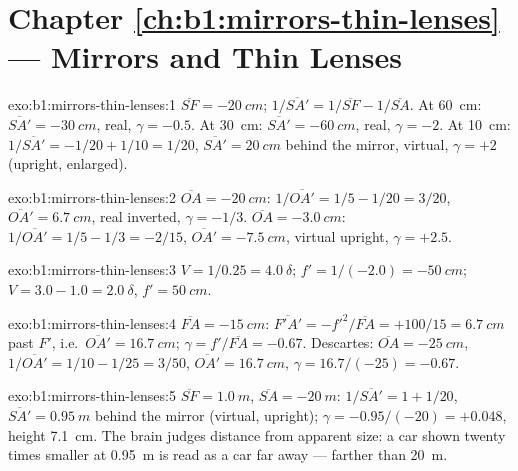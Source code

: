 \section*{Chapter \ref{ch:b1:mirrors-thin-lenses} --- Mirrors and Thin Lenses}

\begin{solution}{exo:b1:mirrors-thin-lenses:1}
$\overline{SF} = \qty{-20}{cm}$; $1/\overline{SA'} = 1/\overline{SF} -
1/\overline{SA}$. At \qty{60}{cm}: $\overline{SA'} = \qty{-30}{cm}$,
real, $\gamma = -0.5$. At \qty{30}{cm}: $\overline{SA'} = \qty{-60}{cm}$,
real, $\gamma = -2$. At \qty{10}{cm}: $1/\overline{SA'} = -1/20 + 1/10
= 1/20$, $\overline{SA'} = \qty{+20}{cm}$ behind the mirror, virtual,
$\gamma = +2$ (upright, enlarged).
\end{solution}

\begin{solution}{exo:b1:mirrors-thin-lenses:2}
$\overline{OA} = \qty{-20}{cm}$: $1/\overline{OA'} = 1/5 - 1/20 = 3/20$,
$\overline{OA'} = \qty{+6.7}{cm}$, real inverted, $\gamma = -1/3$.
$\overline{OA} = \qty{-3.0}{cm}$: $1/\overline{OA'} = 1/5 - 1/3 = -2/15$,
$\overline{OA'} = \qty{-7.5}{cm}$, virtual upright, $\gamma = +2.5$.
\end{solution}

\begin{solution}{exo:b1:mirrors-thin-lenses:3}
$V = 1/0.25 = \qty{+4.0}{\delta}$; $f' = 1/(-2.0) = \qty{-50}{cm}$;
$V = 3.0 - 1.0 = \qty{+2.0}{\delta}$, $f' = \qty{50}{cm}$.
\end{solution}

\begin{solution}{exo:b1:mirrors-thin-lenses:4}
$\overline{FA} = \qty{-15}{cm}$: $\overline{F'A'} = -f'^2/\overline{FA}
= +100/15 = \qty{6.7}{cm}$ past $F'$, i.e.\ $\overline{OA'} = \qty{16.7}{cm}$;
$\gamma = f'/\overline{FA} = -0.67$. Descartes: $\overline{OA} =
\qty{-25}{cm}$, $1/\overline{OA'} = 1/10 - 1/25 = 3/50$,
$\overline{OA'} = \qty{16.7}{cm}$, $\gamma = 16.7/(-25) = -0.67$.
\end{solution}

\begin{solution}{exo:b1:mirrors-thin-lenses:5}
$\overline{SF} = \qty{+1.0}{m}$, $\overline{SA} = \qty{-20}{m}$:
$1/\overline{SA'} = 1 + 1/20$, $\overline{SA'} = \qty{0.95}{m}$ behind
the mirror (virtual, upright); $\gamma = -0.95/(-20) = +0.048$, 
height \qty{7.1}{cm}. The brain judges distance from apparent size: a
car shown twenty times smaller at \qty{0.95}{m} is read as a car far
away --- farther than \qty{20}{m}.
\end{solution}

